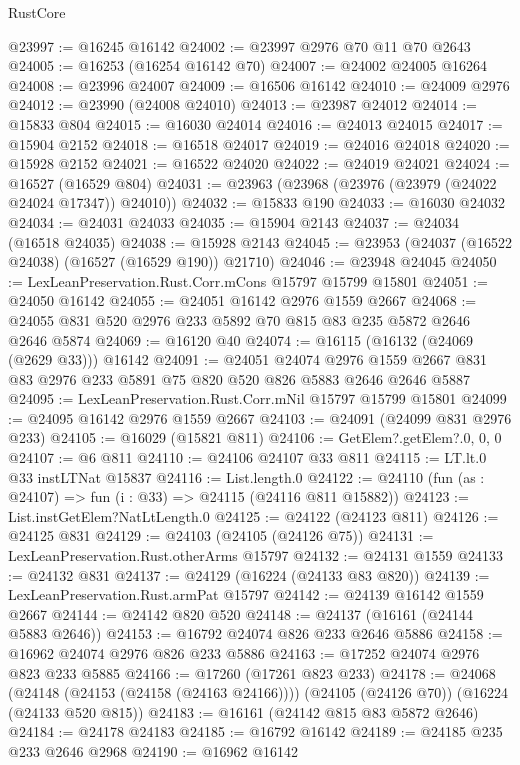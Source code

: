 \begin{lexlean}{RustCore}
\begin{coremodule}
@23997 := @16245 @16142
@24002 := @23997 @2976 @70 @11 @70 @2643
@24005 := @16253 (@16254 @16142 @70)
@24007 := @24002 @24005 @16264
@24008 := @23996 @24007
@24009 := @16506 @16142
@24010 := @24009 @2976
@24012 := @23990 (@24008 @24010)
@24013 := @23987 @24012
@24014 := @15833 @804
@24015 := @16030 @24014
@24016 := @24013 @24015
@24017 := @15904 @2152
@24018 := @16518 @24017
@24019 := @24016 @24018
@24020 := @15928 @2152
@24021 := @16522 @24020
@24022 := @24019 @24021
@24024 := @16527 (@16529 @804)
@24031 := @23963 (@23968 (@23976 (@23979 (@24022 @24024 @17347)) @24010))
@24032 := @15833 @190
@24033 := @16030 @24032
@24034 := @24031 @24033
@24035 := @15904 @2143
@24037 := @24034 (@16518 @24035)
@24038 := @15928 @2143
@24045 := @23953 (@24037 (@16522 @24038) (@16527 (@16529 @190)) @21710)
@24046 := @23948 @24045
@24050 := LexLeanPreservation.Rust.Corr.mCons @15797 @15799 @15801
@24051 := @24050 @16142
@24055 := @24051 @16142 @2976 @1559 @2667
@24068 := @24055 @831 @520 @2976 @233 @5892 @70 @815 @83 @235 @5872 @2646 @2646 @5874
@24069 := @16120 @40
@24074 := @16115 (@16132 (@24069 (@2629 @33))) @16142
@24091 := @24051
    @24074
    @2976
    @1559
    @2667
    @831
    @83
    @2976
    @233
    @5891
    @75
    @820
    @520
    @826
    @5883
    @2646
    @2646
    @5887
@24095 := LexLeanPreservation.Rust.Corr.mNil @15797 @15799 @15801
@24099 := @24095 @16142 @2976 @1559 @2667
@24103 := @24091 (@24099 @831 @2976 @233)
@24105 := @16029 (@15821 @811)
@24106 := GetElem?.getElem?.{0, 0, 0}
@24107 := @6 @811
@24110 := @24106 @24107 @33 @811
@24115 := LT.lt.{0} @33 instLTNat @15837
@24116 := List.length.{0}
@24122 := @24110 (fun (as : @24107) => fun (i : @33) => @24115 (@24116 @811 @15882))
@24123 := List.instGetElem?NatLtLength.{0}
@24125 := @24122 (@24123 @811)
@24126 := @24125 @831
@24129 := @24103 (@24105 (@24126 @75))
@24131 := LexLeanPreservation.Rust.otherArms @15797
@24132 := @24131 @1559
@24133 := @24132 @831
@24137 := @24129 (@16224 (@24133 @83 @820))
@24139 := LexLeanPreservation.Rust.armPat @15797
@24142 := @24139 @16142 @1559 @2667
@24144 := @24142 @820 @520
@24148 := @24137 (@16161 (@24144 @5883 @2646))
@24153 := @16792 @24074 @826 @233 @2646 @5886
@24158 := @16962 @24074 @2976 @826 @233 @5886
@24163 := @17252 @24074 @2976 @823 @233 @5885
@24166 := @17260 (@17261 @823 @233)
@24178 := @24068
    (@24148 (@24153 (@24158 (@24163 @24166))))
    (@24105 (@24126 @70))
    (@16224 (@24133 @520 @815))
@24183 := @16161 (@24142 @815 @83 @5872 @2646)
@24184 := @24178 @24183
@24185 := @16792 @16142
@24189 := @24185 @235 @233 @2646 @2968
@24190 := @16962 @16142

\end{coremodule}
\end{lexlean}
